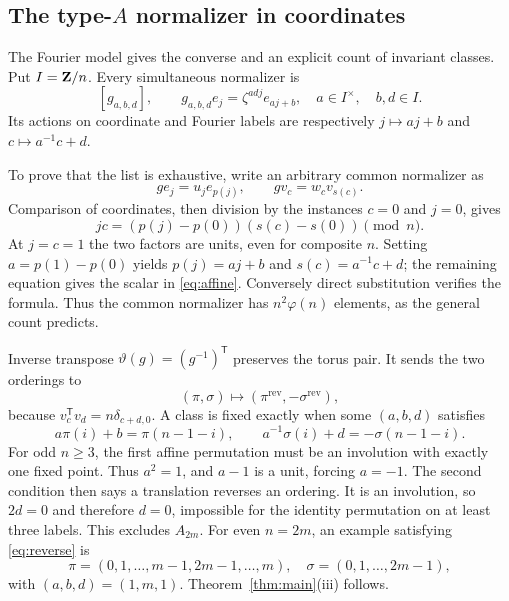 \documentclass[11pt]{article}
\theoremstyle{definition}\newtheorem{definition}[theorem]{Definition}
\theoremstyle{remark}\newtheorem{remark}[theorem]{Remark}
\begin{document}
\subsection{The type-\texorpdfstring{$A$}{A} normalizer in coordinates}
The Fourier model gives the converse and an explicit count of invariant classes. Put $I=\mathbf Z/n$. Every simultaneous normalizer is
\begin{equation}\label{eq:affine}
 [g_{a,b,d}],\qquad
 g_{a,b,d}e_j=\zeta^{ad j}e_{aj+b},
 \quad a\in I^\times,\quad b,d\in I.
\end{equation}
Its actions on coordinate and Fourier labels are respectively $j\mapsto aj+b$ and $c\mapsto a^{-1}c+d$.

To prove that the list is exhaustive, write an arbitrary common normalizer as
\[
 ge_j=u_je_{p(j)},\qquad gv_c=w_cv_{s(c)}.
\]
Comparison of coordinates, then division by the instances $c=0$ and $j=0$, gives
\[
 jc=(p(j)-p(0))(s(c)-s(0))\pmod n.
\]
At $j=c=1$ the two factors are units, even for composite $n$. Setting $a=p(1)-p(0)$ yields $p(j)=aj+b$ and $s(c)=a^{-1}c+d$; the remaining equation gives the scalar in \eqref{eq:affine}. Conversely direct substitution verifies the formula. Thus the common normalizer has $n^2\varphi(n)$ elements, as the general count predicts.

Inverse transpose $\vartheta(g)=(g^{-1})^{\mathsf T}$ preserves the torus pair. It sends the two orderings to
\[
 (\pi,\sigma)\longmapsto(\pi^{\mathrm{rev}},-\sigma^{\mathrm{rev}}),
\]
because $v_c^{\mathsf T}v_d=n\delta_{c+d,0}$. A class is fixed exactly when some $(a,b,d)$ satisfies
\begin{equation}\label{eq:reverse}
 a\pi(i)+b=\pi(n-1-i),\qquad
 a^{-1}\sigma(i)+d=-\sigma(n-1-i).
\end{equation}
For odd $n\geq3$, the first affine permutation must be an involution with exactly one fixed point. Thus $a^2=1$, and $a-1$ is a unit, forcing $a=-1$. The second condition then says a translation reverses an ordering. It is an involution, so $2d=0$ and therefore $d=0$, impossible for the identity permutation on at least three labels. This excludes $A_{2m}$. For even $n=2m$, an example satisfying \eqref{eq:reverse} is
\[
 \pi=(0,1,\ldots,m-1,2m-1,\ldots,m),\quad
 \sigma=(0,1,\ldots,2m-1),
\]
with $(a,b,d)=(1,m,1)$. Theorem~\ref{thm:main}(iii) follows.
\end{document}
